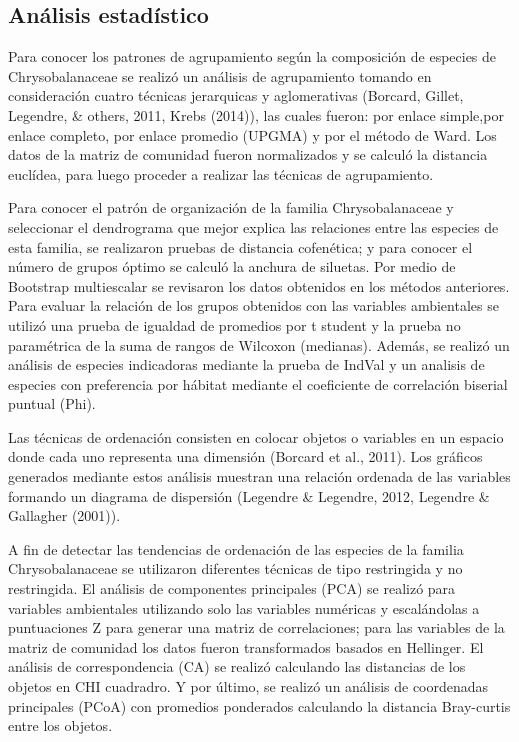 \documentclass[11pt,]{article}
\begin{document}
\subsection{Análisis estadístico}\label{anuxe1lisis-estaduxedstico}

Para conocer los patrones de agrupamiento según la composición de
especies de Chrysobalanaceae se realizó un análisis de agrupamiento
tomando en consideración cuatro técnicas jerarquicas y aglomerativas
(Borcard, Gillet, Legendre, \& others, 2011, Krebs (2014)), las cuales
fueron: por enlace simple,por enlace completo, por enlace promedio
(UPGMA) y por el método de Ward. Los datos de la matriz de comunidad
fueron normalizados y se calculó la distancia euclídea, para luego
proceder a realizar las técnicas de agrupamiento.

Para conocer el patrón de organización de la familia Chrysobalanaceae y
seleccionar el dendrograma que mejor explica las relaciones entre las
especies de esta familia, se realizaron pruebas de distancia cofenética;
y para conocer el número de grupos óptimo se calculó la anchura de
siluetas. Por medio de Bootstrap multiescalar se revisaron los datos
obtenidos en los métodos anteriores. Para evaluar la relación de los
grupos obtenidos con las variables ambientales se utilizó una prueba de
igualdad de promedios por t student y la prueba no paramétrica de la
suma de rangos de Wilcoxon (medianas). Además, se realizó un análisis de
especies indicadoras mediante la prueba de IndVal y un analisis de
especies con preferencia por hábitat mediante el coeficiente de
correlación biserial puntual (Phi).

Las técnicas de ordenación consisten en colocar objetos o variables en
un espacio donde cada uno representa una dimensión (Borcard et al.,
2011). Los gráficos generados mediante estos análisis muestran una
relación ordenada de las variables formando un diagrama de dispersión
(Legendre \& Legendre, 2012, Legendre \& Gallagher (2001)).

A fin de detectar las tendencias de ordenación de las especies de la
familia Chrysobalanaceae se utilizaron diferentes técnicas de tipo
restringida y no restringida. El análisis de componentes principales
(PCA) se realizó para variables ambientales utilizando solo las
variables numéricas y escalándolas a puntuaciones Z para generar una
matriz de correlaciones; para las variables de la matriz de comunidad
los datos fueron transformados basados en Hellinger. El análisis de
correspondencia (CA) se realizó calculando las distancias de los objetos
en CHI cuadradro. Y por último, se realizó un análisis de coordenadas
principales (PCoA) con promedios ponderados calculando la distancia
Bray-curtis entre los objetos.
\end{document}
